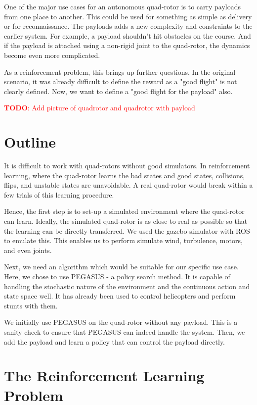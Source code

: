 \documentclass[BTech]{iitmdiss}
\newcommand\todo[1]{\textcolor{red}{{\bf TODO}: #1}}
\begin{document}
One of the major use cases for an autonomous quad-rotor is to carry payloads from one place to another. This could be used for something as simple as delivery or for reconnaissance. The payloads adds a new complexity and constraints to the earlier system. For example, a payload shouldn't hit obstacles on the course. And if the payload is attached using a non-rigid joint to the quad-rotor, the dynamics become even more complicated.

As a reinforcement problem, this brings up further questions. In the original scenario, it was already difficult to define the reward as a "good flight" is not clearly defined. Now, we want to define a "good flight for the payload" also.

\todo{Add picture of quadrotor and quadrotor with payload}

\section{Outline}

It is difficult to work with quad-rotors without good simulators. In reinforcement learning, where the quad-rotor learns the bad states and good states, collisions, flips, and unstable states are unavoidable. A real quad-rotor would break within a few trials of this learning procedure.

Hence, the first step is to set-up a simulated environment where the quad-rotor can learn. Ideally, the simulated quad-rotor is as close to real as possible so that the learning can be directly transferred. We used the gazebo simulator with ROS to emulate this. This enables us to perform simulate wind, turbulence, motors, and even joints.

Next, we need an algorithm which would be suitable for our specific use case. Here, we chose to use PEGASUS - a policy search method. It is capable of handling the stochastic nature of the environment and the continuous action and state space well. It has already been used to control helicopters and perform stunts with them.

We initially use PEGASUS on the quad-rotor without any payload. This is a sanity check to ensure that PEGASUS can indeed handle the system. Then, we add the payload and learn a policy that can control the payload directly.

\section{The Reinforcement Learning Problem}
\end{document}
